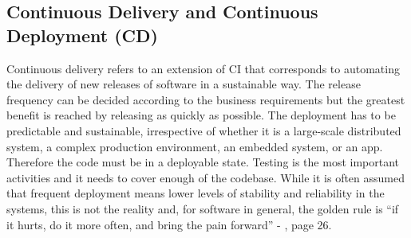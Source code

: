 \documentclass[a4paper,
               keeplastbox,   %
               ]{jacow}
\begin{document}
\subsection{Continuous Delivery and Continuous Deployment (CD)}
Continuous delivery\cite{CD} refers to an extension of CI that corresponds to automating the delivery of new releases of software in a sustainable way. The release frequency can be decided according to the business requirements but the greatest benefit is reached by releasing as quickly as possible.
The deployment has to be predictable and sustainable, irrespective of whether it is a large-scale distributed system, a complex production environment, an embedded system, or an app. Therefore the code must be in a deployable state. Testing is the most important activities and it needs to cover enough of the codebase.
While it is often assumed that frequent deployment means lower levels of stability and reliability in the systems, this is not the reality and, for  software in general, the golden rule is “if it hurts, do it more often, and bring the pain forward” - \cite{CD}, page 26.
\end{document}
